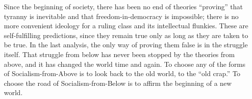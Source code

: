 Since the beginning of society, there has been no end of theories ``proving'' that tyranny is inevitable and that freedom-in-democracy is impossible; there is no more convenient ideology for a ruling class and its intellectual flunkies. These are self-fulfilling predictions, since they remain true only as long as they are taken to be true. In the last analysis, the only way of proving them false is in the struggle itself. That struggle from below has never been stopped by the theories from above, and it has changed the world time and again. To choose any of the forms of Socialism-from-Above is to look back to the old world, to the ``old crap.'' To choose the road of Socialism-from-Below is to affirm the beginning of a new world.
